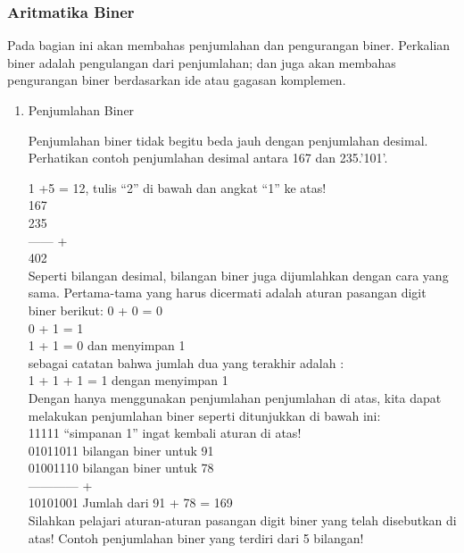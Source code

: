 \documentclass{article}
\begin{document}

\subsubsection{Aritmatika Biner}

Pada bagian ini akan membahas penjumlahan dan pengurangan biner. Perkalian biner adalah pengulangan dari penjumlahan; dan juga akan membahas pengurangan biner berdasarkan ide atau gagasan komplemen.

\begin{enumerate}

\item Penjumlahan Biner

Penjumlahan biner tidak begitu beda jauh dengan penjumlahan desimal. Perhatikan contoh penjumlahan desimal antara 167 dan 235.'101'.

1 +5 = 12, tulis “2” di bawah dan angkat “1” ke atas! \\
167 \\
235 \\
------ + \\
402 \\

Seperti bilangan desimal, bilangan biner juga dijumlahkan dengan cara yang sama. Pertama-tama yang harus dicermati adalah aturan pasangan digit biner berikut:
0 + 0 = 0 \\
0 + 1 = 1 \\
1 + 1 = 0 \textrightarrow dan menyimpan 1 \\

sebagai catatan bahwa jumlah dua yang terakhir adalah : \\
1 + 1 + 1 = 1 \textrightarrow dengan menyimpan 1 \\

Dengan hanya menggunakan penjumlahan penjumlahan di atas, kita dapat melakukan penjumlahan biner seperti ditunjukkan di bawah ini: \\
11111 \textrightarrow “simpanan 1” ingat kembali aturan di atas! \\
01011011 \textrightarrow bilangan biner untuk 91 \\
01001110 \textrightarrow bilangan biner untuk 78 \\
------------ + \\
10101001 \textrightarrow Jumlah dari 91 + 78 = 169 \\

Silahkan pelajari aturan-aturan pasangan digit biner yang telah disebutkan di atas! Contoh penjumlahan biner yang terdiri dari 5 bilangan! \\





\end{enumerate}
\end{document}
